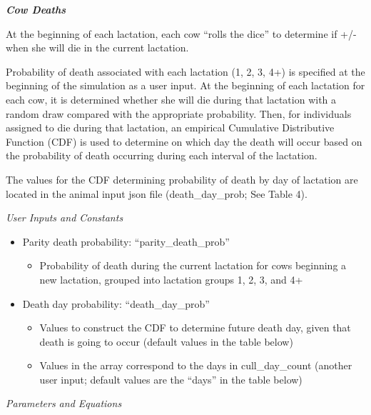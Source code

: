 \begin{refsection}
\textbf{\textit{Cow Deaths}} 
\vspace{0.3cm}

At the beginning of each lactation, each cow “rolls the dice” to determine if +/- when she will die in the current lactation. 
    
Probability of death associated with each lactation (1, 2, 3, 4+) is specified at the beginning of the simulation as a user input. At the beginning of each lactation for each cow, it is determined whether she will die during that lactation with a random draw compared with the appropriate probability. Then, for individuals assigned to die during that lactation, an empirical Cumulative Distributive Function (CDF) is used to determine on which day the death will occur based on the probability of death occurring during each interval of the lactation. 

The values for the CDF determining probability of death by day of lactation are located in the animal input json file (death\_day\_prob; See Table 4). 


         \textit{User Inputs and Constants}
         \vspace{0.1cm}

         \begin{itemize}
             \item Parity death probability: “parity\_death\_prob” 
            \begin{itemize}
                \item Probability of death during the current lactation for cows beginning a new lactation, grouped into lactation groups 1, 2, 3, and 4+
            \end{itemize}
             \item Death day probability: “death\_day\_prob”
             \begin{itemize}
                 \item Values to construct the CDF to determine future death day, given that death is going to occur (default values in the table below) 
                 \item Values in the array correspond to the days in cull\_day\_count (another user input; default values are the “days” in the table below) 
             \end{itemize}

         \end{itemize}

         \textit{Parameters and Equations}
         \vspace{0.1cm}
         

\end{refsection}
